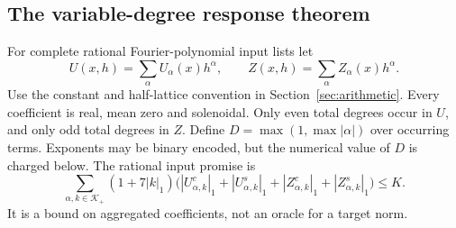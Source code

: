 \documentclass[11pt,a4paper]{amsart}
\theoremstyle{definition}
\theoremstyle{remark}
\numberwithin{equation}{section}
\begin{document}
\subsection{The variable-degree response theorem}
For complete rational Fourier-polynomial input lists let
\begin{equation}\label{eq:nonlinear-targets}
 U(x,h)=\sum_\alpha U_\alpha(x)h^\alpha,\qquad
 Z(x,h)=\sum_\alpha Z_\alpha(x)h^\alpha.
\end{equation}
Use the constant and half-lattice convention in
Section~\ref{sec:arithmetic}. Every coefficient is real, mean zero and
solenoidal. Only even total degrees occur in $U$, and only odd total degrees
in $Z$. Define $D=\max(1,\max|\alpha|)$ over occurring terms. Exponents
may be binary encoded, but the numerical value of $D$ is charged below.
The rational input promise is
\begin{equation}\label{eq:coefficient-promise}
 \sum_{\alpha,k\in\mathcal K_+}(1+7|k|_1)
 \bigl(|U_{\alpha,k}^c|_1+|U_{\alpha,k}^s|_1+
       |Z_{\alpha,k}^c|_1+|Z_{\alpha,k}^s|_1\bigr)\le K.
\end{equation}
It is a bound on aggregated coefficients, not an oracle for a target norm.
\end{document}
